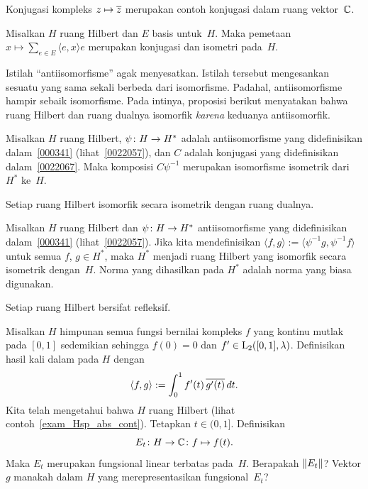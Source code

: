 \begin{exam} Konjugasi kompleks $z \mapsto \overline{z}$ merupakan contoh konjugasi dalam
ruang vektor~$\mathbb{C}$.
\end{exam}

\begin{exam}\label{0022067} Misalkan $H$ ruang Hilbert dan $E$ basis untuk~$H$. Maka
pemetaan $x \mapsto \sum_{e \in E}\langle e,x \rangle e$ merupakan konjugasi dan isometri pada~$H$.
\end{exam}

Istilah ``antiisomorfisme'' agak menyesatkan. Istilah tersebut mengesankan sesuatu yang sama sekali
berbeda dari isomorfisme. Padahal, antiisomorfisme hampir sebaik isomorfisme.
Pada intinya, proposisi berikut menyatakan bahwa ruang Hilbert dan ruang dualnya isomorfik
\emph{karena} keduanya antiisomorfik.

\begin{prop}\label{0022071} Misalkan $H$ ruang Hilbert, $\psi\colon H \rightarrow H^*$ adalah
antiisomorfisme yang didefinisikan dalam~\ref{000341} (lihat~\ref{0022057}), dan $C$ adalah konjugasi
yang didefinisikan dalam~\ref{0022067}. Maka komposisi $C \psi^{-1}$ merupakan isomorfisme isometrik
dari $H^*$ ke~$H$.
\end{prop}

\begin{cor}\label{cor_Hsp_iso_dual} Setiap ruang Hilbert isomorfik secara isometrik dengan ruang dualnya.
\end{cor}

\begin{prop} Misalkan $H$ ruang Hilbert dan $\psi\colon H \rightarrow H^*$ antiisomorfisme
yang didefinisikan dalam~\ref{000341} (lihat~\ref{0022057}). Jika kita mendefinisikan $\langle f,g \rangle :=
\langle \psi^{-1}g, \psi^{-1}f \rangle$ untuk semua $f$, $g \in H^*$, maka $H^*$ menjadi
ruang Hilbert yang isomorfik secara isometrik dengan~$H$. Norma yang dihasilkan pada $H^*$ adalah norma
yang biasa digunakan.
\end{prop}

\begin{cor} Setiap ruang Hilbert bersifat refleksif.
\end{cor}

\begin{exam} Misalkan $H$ himpunan semua fungsi bernilai kompleks $f$ yang kontinu mutlak
pada $[0,1]$ sedemikian sehingga $f(0) = 0$ dan $f' \in
\mathrm{L_{2}}([0,1],\lambda)$. Definisikan hasil kali dalam pada $H$ dengan
 \[\langle f,g \rangle := \int_0^1 f'(t)\,\overline{g'(t)}\,dt.\]
Kita telah mengetahui bahwa $H$ ruang Hilbert (lihat contoh~\ref{exam_Hsp_abs_cont}).
Tetapkan $t \in (0,1]$. Definisikan
   \[ E_t\colon H \rightarrow \mathbb{C}\colon f \mapsto f(t). \]
Maka $E_t$ merupakan fungsional linear terbatas pada~$H$. Berapakah $\lVert E_t\rVert$?
Vektor $g$ manakah dalam $H$ yang merepresentasikan fungsional~$E_t$?
\end{exam}

